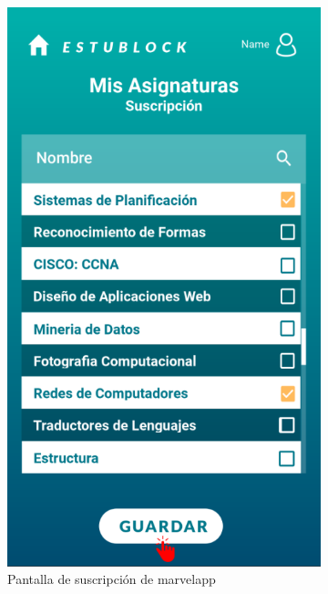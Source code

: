 \begin{figure}[hbt]
	\centering
	\begin{subfigure}[b]{0.4\linewidth}
		\centering
        \includegraphics[width=0.7\linewidth]{figs/Desarrollo/Interfaz/marvel_asignaturas}
        \caption[Marvel Suscribirse]{Pantalla de suscripción de marvelapp}
	\end{subfigure} 
	\begin{subfigure}[b]{0.4\linewidth}
		\centering

\end{subfigure}
\end{figure}
